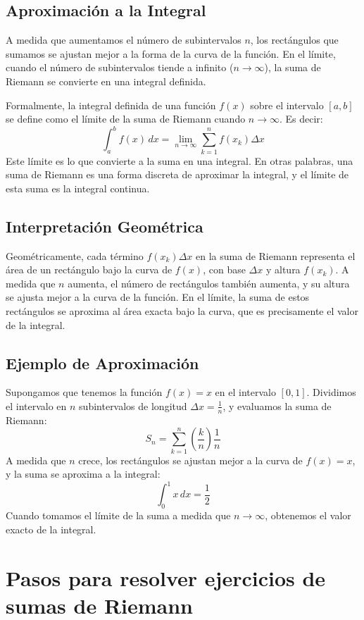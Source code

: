 \documentclass[answers]{exam} %
\begin{document}
\subsection{Aproximación a la Integral}
A medida que aumentamos el número de subintervalos \( n \), los rectángulos que sumamos se ajustan mejor a la forma de la curva de la función. En el límite, cuando el número de subintervalos tiende a infinito (\( n \to \infty \)), la suma de Riemann se convierte en una integral definida.

Formalmente, la integral definida de una función \( f(x) \) sobre el intervalo \( [a, b] \) se define como el límite de la suma de Riemann cuando \( n \to \infty \). Es decir:
\[
\int_a^b f(x) \, dx = \lim_{n \to \infty} \sum_{k=1}^{n} f(x_k) \Delta x
\]
Este límite es lo que convierte a la suma en una integral. En otras palabras, una suma de Riemann es una forma discreta de aproximar la integral, y el límite de esta suma es la integral continua.

\subsection{Interpretación Geométrica}
Geométricamente, cada término \( f(x_k) \Delta x \) en la suma de Riemann representa el área de un rectángulo bajo la curva de \( f(x) \), con base \( \Delta x \) y altura \( f(x_k) \). A medida que \( n \) aumenta, el número de rectángulos también aumenta, y su altura se ajusta mejor a la curva de la función. En el límite, la suma de estos rectángulos se aproxima al área exacta bajo la curva, que es precisamente el valor de la integral.

\subsection{Ejemplo de Aproximación}
Supongamos que tenemos la función \( f(x) = x \) en el intervalo \( [0, 1] \). Dividimos el intervalo en \( n \) subintervalos de longitud \( \Delta x = \frac{1}{n} \), y evaluamos la suma de Riemann:
\[
S_n = \sum_{k=1}^{n} \left( \frac{k}{n} \right) \frac{1}{n}
\]
A medida que \( n \) crece, los rectángulos se ajustan mejor a la curva de \( f(x) = x \), y la suma se aproxima a la integral:
\[
\int_0^1 x \, dx = \frac{1}{2}
\]
Cuando tomamos el límite de la suma a medida que \( n \to \infty \), obtenemos el valor exacto de la integral.


\section{Pasos para resolver ejercicios de sumas de Riemann}
\end{document}

